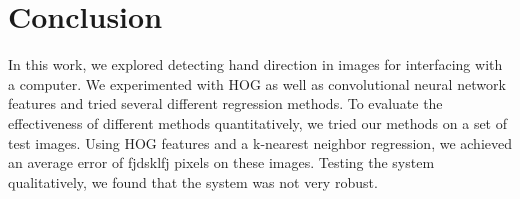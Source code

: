 \documentclass[10pt,twocolumn,letterpaper]{article}
\begin{document}
\section{Conclusion}
In this work, we explored detecting hand direction in images for interfacing with a computer.  We experimented with HOG as well as convolutional neural network features and tried several different regression methods.  To evaluate the effectiveness of different methods quantitatively, we tried our methods on a set of test images.  Using HOG features and a k-nearest neighbor regression, we achieved an average error of fjdsklfj pixels on these images.  Testing the system qualitatively, we found that the system was not very robust.


{\small


}
\end{document}
